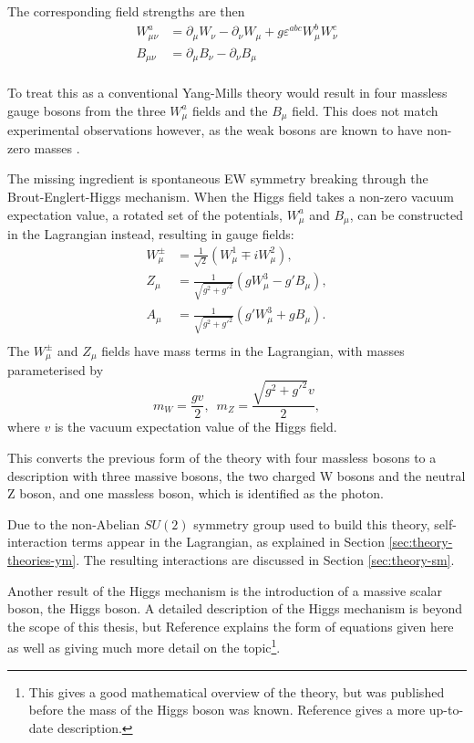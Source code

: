 The corresponding field strengths are then
\begin{equation*}
  \begin{split}
  W^a_{\mu\nu} &= \partial_\mu W_\nu - \partial_\nu W_\mu
               + g \varepsilon^{abc}W^b_\mu W^c_\nu \\
  B_{\mu\nu}   &= \partial_\mu B_\nu - \partial_\nu B_\mu \\
  \end{split}
\end{equation*}

To treat this as a conventional Yang-Mills theory would result in four massless
gauge bosons from the three $W^a_\mu$ fields and the $B_\mu$ field.
This does not match experimental observations however, as the weak bosons are
known to have non-zero masses \cite{UA2discoveryW,UA1discoveryZ}.

The missing ingredient is  spontaneous \ac{EW} symmetry breaking through the
Brout-Englert-Higgs mechanism\cite{Englert1964,Higgs1964}. When the Higgs field
takes a non-zero vacuum expectation value, a rotated set of the potentials,
$W^a_\mu$ and $B_\mu$, can be constructed in the Lagrangian instead, resulting
in gauge fields:
\begin{equation*}
  \begin{split}
    W_\mu^\pm &= \frac1{\sqrt2} (W_\mu^1 \mp iW_\mu^2), \\
    Z_\mu     &= \frac1{\sqrt{g^2 + g'^2}}( gW_\mu^3 - g' B_\mu ), \\
    A_\mu     &= \frac1{\sqrt{g^2 + g'^2}}( g'W_\mu^3 + g B_\mu ). \\
  \end{split}
\end{equation*}
%
The $W^\pm_\mu$ and $Z_\mu$ fields have mass terms in the Lagrangian, with
masses parameterised by
\begin{equation*}
  m_W = \frac{gv}2, \,\,\, m_Z = \frac{\sqrt{g^2 + g'^2}v}2,
\end{equation*}
where $v$ is the vacuum expectation value of the Higgs field.

This converts the previous form of the theory with four massless bosons to a
description with three massive bosons, the two charged W bosons and the
neutral Z boson, and one massless boson, which is identified as the photon.

Due to the non-Abelian $SU(2)$ symmetry group used to build this theory, 
self-interaction terms appear in the Lagrangian, as explained in Section
\ref{sec:theory-theories-ym}. The resulting interactions are discussed in
Section \ref{sec:theory-sm}.

Another result of the Higgs mechanism is the introduction of a massive scalar
boson, the Higgs boson. A detailed description of the Higgs mechanism is beyond
the scope of this thesis, but Reference \cite{Peskin1995}
explains the form of equations given here as well as giving much
more detail on the topic\footnote{
  This gives a good mathematical overview of the theory, but was published
  before the mass of the Higgs boson was known. Reference \cite{Thomson2013}
  gives a more up-to-date description.
}.
